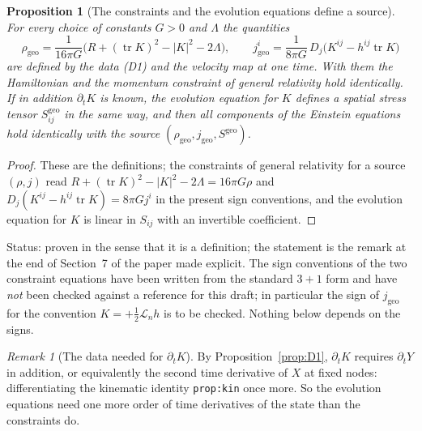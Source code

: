 \documentclass[a4paper,11pt]{article}
\newtheorem{proposition}[theorem]{Proposition}
\theoremstyle{definition}
\theoremstyle{remark}
\newtheorem{remark}[theorem]{Remark}
\DeclareMathOperator{\tr}{tr}
\newcommand{\Lie}{\mathcal{L}}
\newcommand{\status}[1]{\par\noindent\textsf{\small Status: #1}\par}
\begin{document}
\begin{proposition}[The constraints and the evolution equations define a source]\label{prop:source}
For every choice of constants $G>0$ and $\Lambda$ the quantities
\[
\rho_{\mathrm{geo}}=\frac{1}{16\pi G}\big(R+(\tr K)^2-|K|^2-2\Lambda\big),\qquad
j^i_{\mathrm{geo}}=\frac{1}{8\pi G}\,D_j\big(K^{ij}-h^{ij}\tr K\big)
\]
are defined by the data \textup{(D1)} and the velocity map at one time. With them the Hamiltonian and the momentum constraint of general relativity hold identically. If in addition $\partial_tK$ is known, the evolution equation for $K$ defines a spatial stress tensor $S^{\mathrm{geo}}_{ij}$ in the same way, and then all components of the Einstein equations hold identically with the source $(\rho_{\mathrm{geo}},j_{\mathrm{geo}},S^{\mathrm{geo}})$.
\end{proposition}

\begin{proof}
These are the definitions; the constraints of general relativity for a source $(\rho,j)$ read $R+(\tr K)^2-|K|^2-2\Lambda=16\pi G\rho$ and $D_j(K^{ij}-h^{ij}\tr K)=8\pi Gj^i$ in the present sign conventions, and the evolution equation for $K$ is linear in $S_{ij}$ with an invertible coefficient.
\end{proof}
\status{proven in the sense that it is a definition; the statement is the remark at the end of Section~7 of the paper made explicit. The sign conventions of the two constraint equations have been written from the standard $3+1$ form and have \emph{not} been checked against a reference for this draft; in particular the sign of $j_{\mathrm{geo}}$ for the convention $K=+\tfrac12\Lie_nh$ is to be checked. Nothing below depends on the signs.}

\begin{remark}[The data needed for $\partial_tK$]
By Proposition~\ref{prop:D1}, $\partial_tK$ requires $\partial_tY$ in addition, or equivalently the second time derivative of $X$ at fixed nodes: differentiating the kinematic identity \texttt{prop:kin} once more. So the evolution equations need one more order of time derivatives of the state than the constraints do.
\end{remark}
\end{document}
